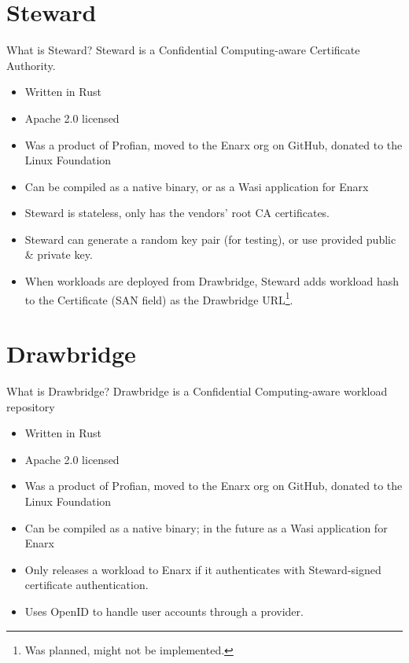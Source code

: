 \documentclass[graphics,compress]{beamer}
\begin{document}
\section{Steward}
\begin{frame}{What is Steward?}
Steward is a Confidential Computing-aware Certificate Authority.
\begin{itemize}
    \item Written in Rust
    \item Apache 2.0 licensed
    \item Was a product of Profian, moved to the Enarx org on GitHub, donated to the Linux Foundation
    \item Can be compiled as a native binary, or as a Wasi application for Enarx
    \item Steward is stateless, only has the vendors' root CA certificates.
    \item Steward can generate a random key pair (for testing), or use provided public \& private key.
    \item When workloads are deployed from Drawbridge, Steward adds workload hash to the Certificate (SAN field) as the Drawbridge URL\footnote{Was planned, might not be implemented.}.
\end{itemize}
\end{frame}

\section{Drawbridge}
\begin{frame}{What is Drawbridge?}
Drawbridge is a Confidential Computing-aware workload repository
\begin{itemize}
    \item Written in Rust
    \item Apache 2.0 licensed
    \item Was a product of Profian, moved to the Enarx org on GitHub, donated to the Linux Foundation
    \item Can be compiled as a native binary; in the future as a Wasi application for Enarx
    \item Only releases a workload to Enarx if it authenticates with Steward-signed certificate authentication.
    \item Uses OpenID to handle user accounts through a provider.
\end{itemize}
\end{frame}
\end{document}

